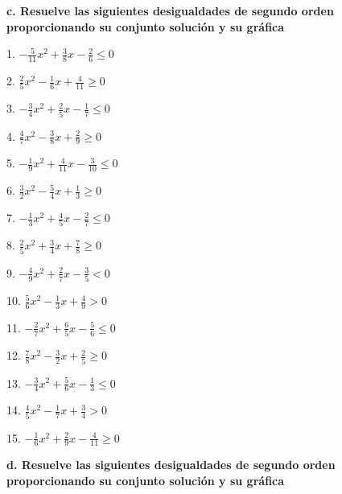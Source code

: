 \documentclass[]{book}
\begin{document}
\textbf{c. Resuelve las siguientes desigualdades de segundo orden
proporcionando su conjunto solución y su gráfica}

\begin{multicols}{2}
1. $-\frac{5}{11}x^2 + \frac{3}{8}x - \frac{2}{6} \leq 0$

2. $\frac{2}{5}x^2 - \frac{1}{6}x + \frac{4}{11} \geq 0$

3. $-\frac{3}{4}x^2 + \frac{2}{5}x - \frac{1}{7} \leq 0$

4. $\frac{4}{7}x^2 - \frac{3}{8}x + \frac{2}{9} \geq 0$

5. $-\frac{1}{9}x^2 + \frac{4}{11}x - \frac{3}{10} \leq 0$

6. $\frac{3}{2}x^2 - \frac{5}{4}x + \frac{1}{3} \geq 0$

7. $-\frac{1}{3}x^2 + \frac{4}{5}x - \frac{2}{7} \leq 0$

8. $\frac{2}{5}x^2 + \frac{3}{4}x + \frac{7}{8} \geq 0$

9. $-\frac{4}{9}x^2 + \frac{2}{7}x - \frac{3}{5} < 0$

10. $\frac{5}{6}x^2 - \frac{1}{3}x + \frac{4}{9} > 0$

11. $-\frac{2}{7}x^2 + \frac{6}{5}x - \frac{5}{6} \leq 0$

12. $\frac{7}{8}x^2 - \frac{3}{2}x + \frac{2}{5} \geq 0$

13. $-\frac{3}{4}x^2 + \frac{5}{6}x - \frac{1}{3} \leq 0$

14. $\frac{4}{5}x^2 - \frac{1}{7}x + \frac{3}{4} > 0$

15. $-\frac{1}{6}x^2 + \frac{2}{9}x - \frac{4}{11} \geq 0$
\end{multicols}

\textbf{d. Resuelve las siguientes desigualdades de segundo orden
proporcionando su conjunto solución y su gráfica}
\end{document}
